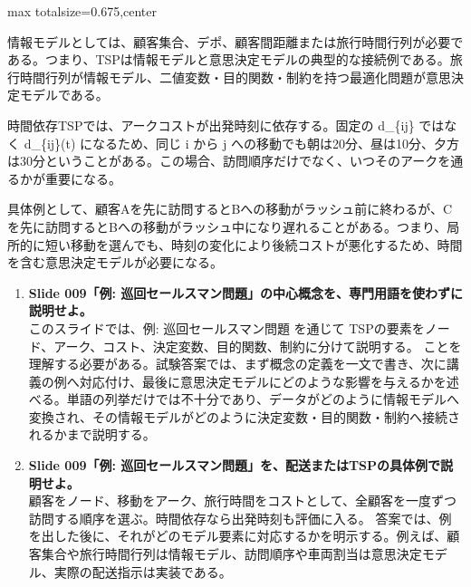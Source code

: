\begin{adjustbox}{max totalsize={\textwidth}{0.675\textheight},center}
\begin{minipage}{\textwidth}
\begin{minipage}[t]{0.485\textwidth}
情報モデルとしては、顧客集合、デポ、顧客間距離または旅行時間行列が必要である。つまり、TSPは情報モデルと意思決定モデルの典型的な接続例である。旅行時間行列が情報モデル、二値変数・目的関数・制約を持つ最適化問題が意思決定モデルである。\par
時間依存TSPでは、アークコストが出発時刻に依存する。固定の d\_\{ij\} ではなく d\_\{ij\}(t) になるため、同じ i から j への移動でも朝は20分、昼は10分、夕方は30分ということがある。この場合、訪問順序だけでなく、いつそのアークを通るかが重要になる。\par
具体例として、顧客Aを先に訪問するとBへの移動がラッシュ前に終わるが、Cを先に訪問するとBへの移動がラッシュ中になり遅れることがある。つまり、局所的に短い移動を選んでも、時刻の変化により後続コストが悪化するため、時間を含む意思決定モデルが必要になる。\par
{}
\begin{enumerate}
\item \textbf{Slide 009「例: 巡回セールスマン問題」の中心概念を、専門用語を使わずに説明せよ。}\\このスライドでは、例: 巡回セールスマン問題 を通じて TSPの要素をノード、アーク、コスト、決定変数、目的関数、制約に分けて説明する。 ことを理解する必要がある。試験答案では、まず概念の定義を一文で書き、次に講義の例へ対応付け、最後に意思決定モデルにどのような影響を与えるかを述べる。単語の列挙だけでは不十分であり、データがどのように情報モデルへ変換され、その情報モデルがどのように決定変数・目的関数・制約へ接続されるかまで説明する。
\item \textbf{Slide 009「例: 巡回セールスマン問題」を、配送またはTSPの具体例で説明せよ。}\\顧客をノード、移動をアーク、旅行時間をコストとして、全顧客を一度ずつ訪問する順序を選ぶ。時間依存なら出発時刻も評価に入る。 答案では、例を出した後に、それがどのモデル要素に対応するかを明示する。例えば、顧客集合や旅行時間行列は情報モデル、訪問順序や車両割当は意思決定モデル、実際の配送指示は実装である。
\end{enumerate}
\end{minipage}
\end{minipage}
\end{adjustbox}


